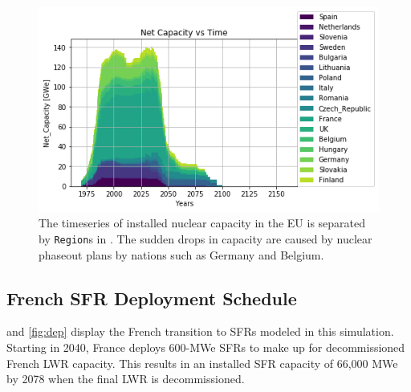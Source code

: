 \begin{figure}[htbp!]
    \begin{center}
        \includegraphics[scale=0.6]{./images/eu_future/power_plot.png}
    \end{center}
    \caption{The timeseries of installed nuclear capacity in the EU is separated by \texttt{Region}s in \Cyclus.
             The sudden drops in capacity are caused by nuclear phaseout plans by nations such as Germany and Belgium.
             }
    \label{fig:eu_pow}
\end{figure}


\subsection{French \gls{SFR} Deployment Schedule}

 and \ref{fig:dep} display
the French transition to \glspl{SFR} modeled in this simulation.
Starting in 2040, France deploys 600-\gls{MWe} \glspl{SFR} to make up for 
decommissioned French \gls{LWR} capacity. This results in an installed 
\gls{SFR} 
capacity of 66,000 \gls{MWe} by 2078 when the final \gls{LWR} is 
decommissioned. 

